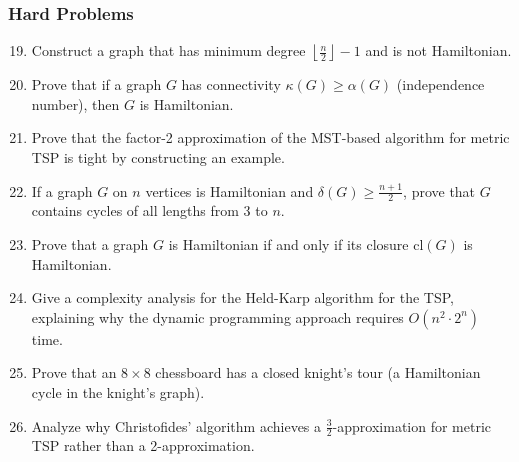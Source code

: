 \documentclass{article}
\theoremstyle{definition}
\begin{document}
\subsubsection{Hard Problems}
\begin{enumerate}\setcounter{enumi}{18}
\item Construct a graph that has minimum degree $\left\lfloor\frac{n}{2}\right\rfloor - 1$ and is not Hamiltonian.

\item Prove that if a graph $G$ has connectivity $\kappa(G) \geq \alpha(G)$ (independence number), then $G$ is Hamiltonian.

\item Prove that the factor-2 approximation of the MST-based algorithm for metric TSP is tight by constructing an example.

\item If a graph $G$ on $n$ vertices is Hamiltonian and $\delta(G) \geq \frac{n+1}{2}$, prove that $G$ contains cycles of all lengths from 3 to $n$.

\item Prove that a graph $G$ is Hamiltonian if and only if its closure $\text{cl}(G)$ is Hamiltonian.

\item Give a complexity analysis for the Held-Karp algorithm for the TSP, explaining why the dynamic programming approach requires $O(n^2 \cdot 2^n)$ time.

\item Prove that an $8 \times 8$ chessboard has a closed knight's tour (a Hamiltonian cycle in the knight's graph).

\item Analyze why Christofides' algorithm achieves a $\frac{3}{2}$-approximation for metric TSP rather than a 2-approximation.
\end{enumerate}
\end{document}
